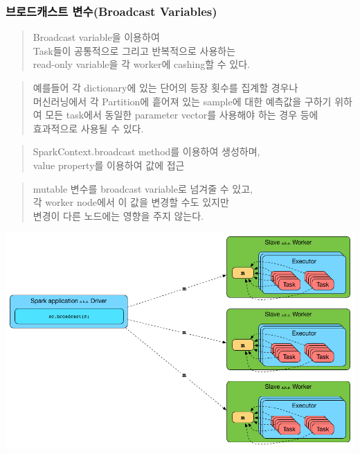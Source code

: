 \documentclass[11pt]{article}
\makeatletter
\def\maxwidth{\ifdim\Gin@nat@width>\linewidth\linewidth
    \else\Gin@nat@width\fi}
\let\Oldincludegraphics\includegraphics
\renewcommand{\includegraphics}[1]{\Oldincludegraphics[width=.8\maxwidth]{#1}}
\makeatother
\begin{document}
    \subsubsection{브로드캐스트 변수(Broadcast
Variables)}\label{uxbe0cuxb85cuxb4dcuxce90uxc2a4uxd2b8-uxbcc0uxc218broadcast-variables}

    \begin{quote}
Broadcast variable을 이용하여\\Task들이 공통적으로 그리고 반복적으로
사용하는\\read-only variable을 각 worker에 cashing할 수 있다.
\end{quote}

\begin{quote}
예를들어 각 dictionary에 있는 단어의 등장 횟수를 집계할
경우나\\머신러닝에서 각 Partition에 흩어져 있는 sample에 대한 예측값을
구하기 위하여 모든 task에서 동일한 parameter vector를 사용해야 하는 경우
등에\\효과적으로 사용될 수 있다.
\end{quote}

    \begin{quote}
SparkContext.broadcast method를 이용하여 생성하며,\\value property를
이용하여 값에 접근
\end{quote}

\begin{quote}
mutable 변수를 broadcast variable로 넘겨줄 수 있고,\\각 worker node에서
이 값을 변경할 수도 있지만\\변경이 다른 노드에는 영향을 주지 않는다.
\end{quote}

    \includegraphics{./_images/sparkcontext-broadcast-executors.png}
\end{document}
